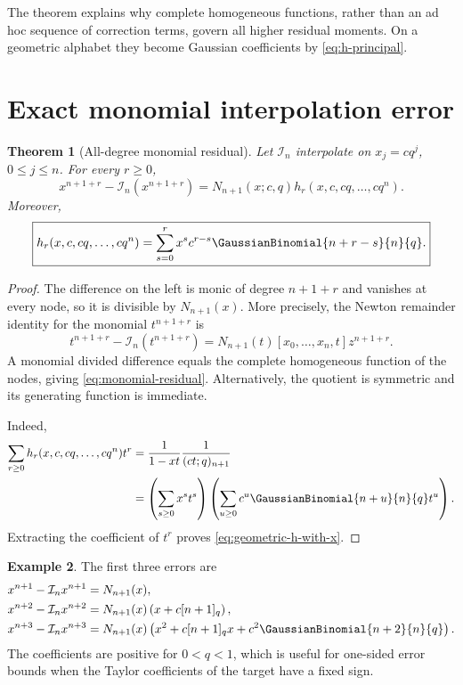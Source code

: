 \documentclass[11pt,oneside]{book}
\numberwithin{equation}{chapter}
\newtheorem{theorem}{Theorem}[chapter]
\theoremstyle{definition}
\newtheorem{example}[theorem]{Example}
\theoremstyle{remark}
\newcommand{\Interp}{\mathcal I}
\begin{document}
The theorem explains why complete homogeneous functions, rather than an
ad hoc sequence of correction terms, govern all higher residual moments.
On a geometric alphabet they become Gaussian coefficients by
\eqref{eq:h-principal}.

\section{Exact monomial interpolation error}

\begin{theorem}[All-degree monomial residual]
\label{thm:monomial-residual}
Let $\Interp_n$ interpolate on $x_j=cq^j$, $0\le j\le n$.  For every
$r\ge0$,
\begin{equation}
 \boxed{
 x^{n+1+r}-\Interp_n(x^{n+1+r})
 =N_{n+1}(x;c,q)h_r(x,c,cq,\ldots,cq^n).}
 \label{eq:monomial-residual}
\end{equation}
Moreover,
\begin{equation}
 \boxed{
 h_r(x,c,cq,\ldots,cq^n)
 =\sum_{s=0}^rx^sc^{r-s}\GaussianBinomial{n+r-s}{n}{q}.}
 \label{eq:geometric-h-with-x}
\end{equation}
\end{theorem}

\begin{proof}
The difference on the left is monic of degree $n+1+r$ and vanishes at every
node, so it is divisible by $N_{n+1}(x)$.  More precisely, the Newton
remainder identity for the monomial $t^{n+1+r}$ is
\[
 t^{n+1+r}-\Interp_n(t^{n+1+r})
 =N_{n+1}(t)[x_0,\ldots,x_n,t]z^{n+1+r}.
\]
A monomial divided difference equals the complete homogeneous function of
the nodes, giving \eqref{eq:monomial-residual}.  Alternatively, the quotient
is symmetric and its generating function is immediate.

Indeed,
\begin{align*}
 \sum_{r\ge0}h_r(x,c,cq,\ldots,cq^n)t^r
 &=\frac1{1-xt}\frac1{(ct;q)_{n+1}}\\
 &=\left(\sum_{s\ge0}x^st^s\right)
   \left(\sum_{u\ge0}c^u\GaussianBinomial{n+u}{n}{q}t^u\right).
\end{align*}
Extracting the coefficient of $t^r$ proves
\eqref{eq:geometric-h-with-x}.
\end{proof}

\begin{example}
The first three errors are
\begin{align*}
 x^{n+1}-\Interp_nx^{n+1}
 &=N_{n+1}(x),\\
 x^{n+2}-\Interp_nx^{n+2}
 &=N_{n+1}(x)\left(x+c[n+1]_q\right),\\
 x^{n+3}-\Interp_nx^{n+3}
 &=N_{n+1}(x)
 \left(x^2+c[n+1]_qx+c^2\GaussianBinomial{n+2}{n}{q}\right).
\end{align*}
The coefficients are positive for $0<q<1$, which is useful for one-sided
error bounds when the Taylor coefficients of the target have a fixed sign.
\end{example}
\end{document}
